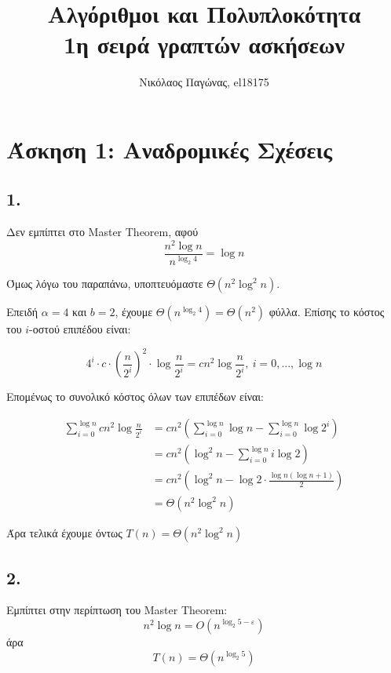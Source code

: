 

\newcommand{\imagesPath}{.}

\title{
	Αλγόριθμοι και Πολυπλοκότητα \\
	1η σειρά γραπτών ασκήσεων
}
\author{Νικόλαος Παγώνας, el18175}
\date{}


	\maketitle
	
	\section*{Άσκηση 1: Αναδρομικές Σχέσεις}
		\subsection*{1.}
			Δεν εμπίπτει στο Master Theorem, αφού 
			\[
				\dfrac{n^2 \log n}{n^{\log_2 4}} = \log n 
			\]
			
			Όμως λόγω του παραπάνω, υποπτευόμαστε $Θ(n^2 \log^2 n)$.
			
			Επειδή $α = 4$ και $b = 2$, έχουμε $Θ(n^{\log_2 4}) = Θ(n^2)$ φύλλα. Επίσης το κόστος του $i$-οστού επιπέδου είναι: 
			
			\[
				4^i \cdot c \cdot \left(\dfrac{n}{2^i}\right)^2 \cdot \log\frac{n}{2^i} = c n^2 \log\frac{n}{2^i}, \ i = 0,...,\log n
			\]
			
			Επομένως το συνολικό κόστος όλων των επιπέδων είναι:
			
			\begin{align*}
				\sum_{i=0}^{\log n} cn^2\log\frac{n}{2^i} &= 
				 cn^2 \left( \sum_{i=0}^{\log n} \log n - \sum_{i=0}^{\log n} \log 2^i \right) \\
				 &= cn^2\left(\log^2 n - \sum_{i=0}^{\log n} i \log 2\right) \\
				 &= cn^2\left(\log^2 n - \log 2 \cdot \frac{\log n\left(\log n + 1\right)}{2}\right) \\
				 &= Θ(n^2\log^2 n)
			\end{align*}
			
			Άρα τελικά έχουμε όντως $T(n) = Θ(n^2 \log^2n)$
			
			
			
		\subsection*{2.}
			Εμπίπτει στην περίπτωση του Master Theorem:
			\[
				n^2 \log n = O(n^{\log_2 5 - ε})
			\]
			άρα
			\[
				T(n) = Θ(n^{\log_2 5})
			\]
